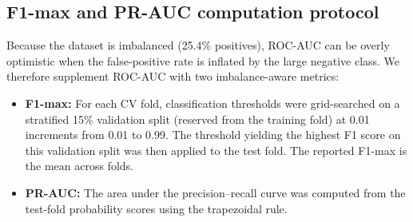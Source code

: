\documentclass[11pt,a4paper]{article}
\begin{document}
\begin{table}[H]
\centering
\caption{Complete metrics across feature ablations (SVM-RBF C=10). F1 is computed at threshold = 0.5.}
\label{tab:full_ablation}
\end{table}

\subsection{F1-max and PR-AUC computation protocol}

Because the dataset is imbalanced (25.4\% positives), ROC-AUC can be overly optimistic when the false-positive rate is inflated by the large negative class. We therefore supplement ROC-AUC with two imbalance-aware metrics:

\begin{itemize}
    \item \textbf{F1-max:} For each CV fold, classification thresholds were grid-searched on a stratified 15\% validation split (reserved from the training fold) at 0.01 increments from 0.01 to 0.99. The threshold yielding the highest F1 score on this validation split was then applied to the test fold. The reported F1-max is the mean across folds.
    \item \textbf{PR-AUC:} The area under the precision--recall curve was computed from the test-fold probability scores using the trapezoidal rule.
\end{itemize}
\end{document}
